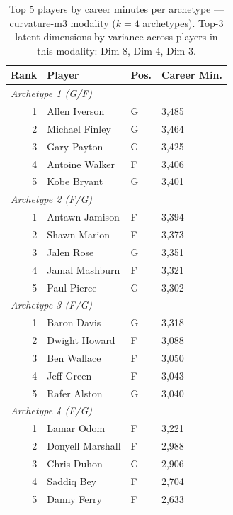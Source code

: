 \begin{table}[htbp]
  \centering\small
  \begin{tabular}{rlll}
    \toprule
    Rank & Player & Pos. & Career Min. \\
    \midrule
    \multicolumn{4}{l}{\textit{Archetype 1 (G/F)}} \\
    \midrule
    1 & Allen Iverson & G & 3,485 \\
    2 & Michael Finley & G & 3,464 \\
    3 & Gary Payton & G & 3,425 \\
    4 & Antoine Walker & F & 3,406 \\
    5 & Kobe Bryant & G & 3,401 \\
    \midrule[0.4pt]
    \multicolumn{4}{l}{\textit{Archetype 2 (F/G)}} \\
    \midrule
    1 & Antawn Jamison & F & 3,394 \\
    2 & Shawn Marion & F & 3,373 \\
    3 & Jalen Rose & G & 3,351 \\
    4 & Jamal Mashburn & F & 3,321 \\
    5 & Paul Pierce & G & 3,302 \\
    \midrule[0.4pt]
    \multicolumn{4}{l}{\textit{Archetype 3 (F/G)}} \\
    \midrule
    1 & Baron Davis & G & 3,318 \\
    2 & Dwight Howard & F & 3,088 \\
    3 & Ben Wallace & F & 3,050 \\
    4 & Jeff Green & F & 3,043 \\
    5 & Rafer Alston & G & 3,040 \\
    \midrule[0.4pt]
    \multicolumn{4}{l}{\textit{Archetype 4 (F/G)}} \\
    \midrule
    1 & Lamar Odom & F & 3,221 \\
    2 & Donyell Marshall & F & 2,988 \\
    3 & Chris Duhon & G & 2,906 \\
    4 & Saddiq Bey & F & 2,704 \\
    5 & Danny Ferry & F & 2,633 \\
    \bottomrule
  \end{tabular}
  \caption{Top 5 players by career minutes per archetype --- curvature-m3 modality ($k=4$ archetypes). Top-3 latent dimensions by variance across players in this modality: Dim 8, Dim 4, Dim 3.}
  \label{tab:arch_reps_curvature_m3}
\end{table}

